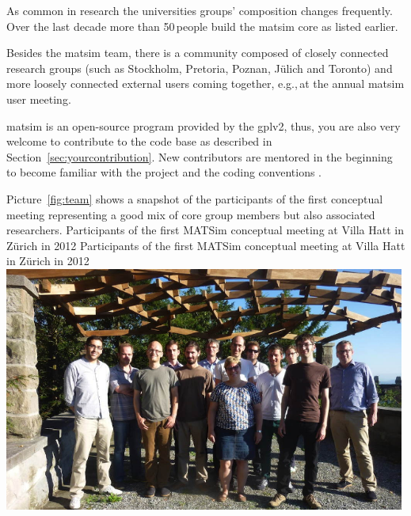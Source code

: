As common in research the universities groups' composition changes frequently. Over the last decade more than 50\,people build the \gls{matsim} core as listed earlier.

Besides the \gls{matsim} team, there is a community composed of closely connected research groups (such as Stockholm, Pretoria, Poznan, Jülich and Toronto) and more loosely connected external users coming together, e.g.,\,at the annual \gls{matsim} user meeting.   

\gls{matsim} is an open-source program provided by the \gls{gplv2}, thus, you are also very welcome to contribute to the code base as described in Section~\ref{sec:yourcontribution}. New contributors are mentored in the beginning \citep[][]{MATSIM-BecomingAContributor_Webpage_2015} to become familiar with the project and the coding conventions \citep[][]{MATSIM-CodingGuide_Webpage_2015}.

Picture~\ref{fig:team} shows a snapshot of the participants of the first conceptual meeting representing a good mix of core group members but also associated researchers.
%
\createfigure%
{Participants of the first MATSim conceptual meeting at Villa Hatt in Zürich in 2012}%
{Participants of the first MATSim conceptual meeting at Villa Hatt in Zürich in 2012}%
{\label{fig:team}}%
{\includegraphics[width=0.99\textwidth, angle=0]{extending/figures/ConceptualMeetingVillaHatt.png}}%
{}

